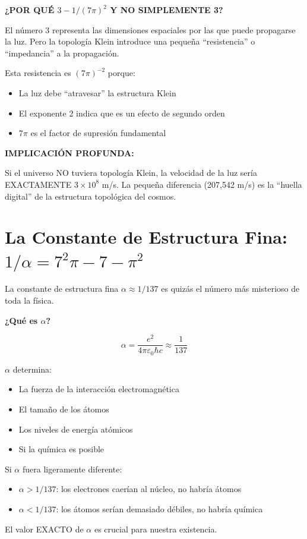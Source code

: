 \textbf{¿POR QUÉ $3 - 1/(7\pi)^2$ Y NO SIMPLEMENTE 3?}

El número 3 representa las dimensiones espaciales por las que puede
propagarse la luz. Pero la topología Klein introduce una pequeña
``resistencia'' o ``impedancia'' a la propagación.

Esta resistencia es $(7\pi)^{-2}$ porque:
\begin{itemize}
    \item La luz debe ``atravesar'' la estructura Klein
    \item El exponente 2 indica que es un efecto de segundo orden
    \item $7\pi$ es el factor de supresión fundamental
\end{itemize}

\textbf{IMPLICACIÓN PROFUNDA:}

Si el universo NO tuviera topología Klein, la velocidad de la luz sería
EXACTAMENTE $3 \times 10^8$ m/s. La pequeña diferencia (207,542 m/s) es la
``huella digital'' de la estructura topológica del cosmos.


\section{La Constante de Estructura Fina: $1/\alpha = 7^2\pi - 7 - \pi^2$}

La constante de estructura fina $\alpha \approx 1/137$ es quizás el número más
misterioso de toda la física.

\begin{nivelconceptual}
\textbf{¿Qué es $\alpha$?}

\begin{equation}
\alpha = \frac{e^2}{4\pi\varepsilon_0\hbar c} \approx \frac{1}{137}
\end{equation}

$\alpha$ determina:
\begin{itemize}
    \item La fuerza de la interacción electromagnética
    \item El tamaño de los átomos
    \item Los niveles de energía atómicos
    \item Si la química es posible
\end{itemize}

Si $\alpha$ fuera ligeramente diferente:
\begin{itemize}
    \item $\alpha > 1/137$: los electrones caerían al núcleo, no habría átomos
    \item $\alpha < 1/137$: los átomos serían demasiado débiles, no habría química
\end{itemize}

El valor EXACTO de $\alpha$ es crucial para nuestra existencia.
\end{nivelconceptual}


